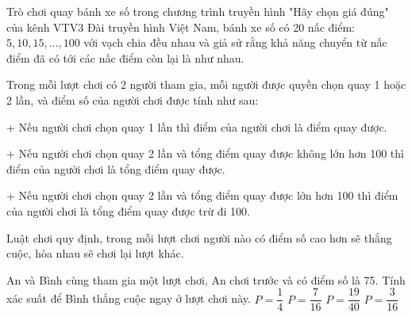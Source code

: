 \begin{ex}%
	Trò chơi quay bánh xe số trong chương trình truyền hình "Hãy chọn giá đúng" của kênh VTV3 Đài truyền hình Việt Nam, bánh xe số có 20 nấc điểm: $5, 10, 15,...,100$ với vạch chia đều nhau và giả sử rằng khả năng chuyển từ nấc điểm đã có tới các nấc điểm còn lại là như nhau.
	
	Trong mỗi lượt chơi có 2 người tham gia, mỗi người được quyền chọn quay 1 hoặc 2 lần, và điểm số của người chơi được tính như sau:
	
	+ Nếu người chơi chọn quay 1 lần thì điểm của người chơi là điểm quay được.
	
	+ Nếu người chơi chọn quay 2 lần và tổng điểm quay được không lớn hơn 100 thì điểm của người chơi là tổng điểm quay được. 
	
	+ Nếu người chơi chọn quay 2 lần và tổng điểm quay được lớn hơn 100 thì điểm của người chơi là tổng điểm quay được trừ đi 100.
	
	Luật chơi quy định, trong mỗi lượt chơi người nào có điểm số cao hơn sẽ thắng cuộc, hòa nhau sẽ chơi lại lượt khác.
	
	An và Bình cùng tham gia một lượt chơi, An chơi trước và có điểm số là 75. Tính xác suất để Bình thắng cuộc ngay ở lượt chơi này.
	\choice
	{$P=\dfrac{1}{4}$}
	{\True $P=\dfrac{7}{16}$}
	{$P=\dfrac{19}{40}$}
	{$P=\dfrac{3}{16}$}
\end{ex}

